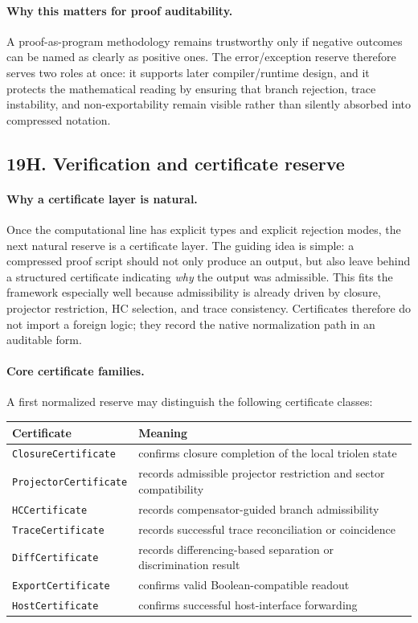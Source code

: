 \paragraph{Why this matters for proof auditability.}
A proof-as-program methodology remains trustworthy only if negative outcomes can be named as clearly as positive ones. The error/exception reserve therefore serves two roles at once: it supports later compiler/runtime design, and it protects the mathematical reading by ensuring that branch rejection, trace instability, and non-exportability remain visible rather than silently absorbed into compressed notation.

\subsection*{19H. Verification and certificate reserve}

\paragraph{Why a certificate layer is natural.}
Once the computational line has explicit types and explicit rejection modes, the next natural reserve is a certificate layer. The guiding idea is simple: a compressed proof script should not only produce an output, but also leave behind a structured certificate indicating \emph{why} the output was admissible. This fits the framework especially well because admissibility is already driven by closure, projector restriction, HC selection, and trace consistency. Certificates therefore do not import a foreign logic; they record the native normalization path in an auditable form.

\paragraph{Core certificate families.}
A first normalized reserve may distinguish the following certificate classes:
\begin{center}
\small
\begin{tabular}{@{}p{}p{}@{}}
\toprule
Certificate & Meaning \\
\midrule
\texttt{ClosureCertificate} & confirms closure completion of the local triolen state \\
\texttt{ProjectorCertificate} & records admissible projector restriction and sector compatibility \\
\texttt{HCCertificate} & records compensator-guided branch admissibility \\
\texttt{TraceCertificate} & records successful trace reconciliation or coincidence \\
\texttt{DiffCertificate} & records differencing-based separation or discrimination result \\
\texttt{ExportCertificate} & confirms valid Boolean-compatible readout \\
\texttt{HostCertificate} & confirms successful host-interface forwarding \\
\bottomrule
\end{tabular}
\end{center}

